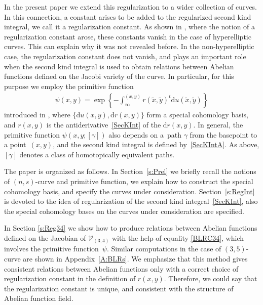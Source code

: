 \documentclass[11pt]{article}
\numberwithin{equation}{section}
\newcommand{\rmd}{\mathrm{d}}
\begin{document}
In the present paper we extend this regularization to a wider collection of curves. In this connection, a constant arises to be added to the regularized second kind integral, we call it a regularization constant. As shown in \cite[Section~193]{BakerAF}, where the notion of a regularization constant arose, these constants vanish in the case of hyperelliptic curves. This can explain why it was not revealed before. In the non-hyperelliptic case, the regularization constant does not vanish, and plays an important role when the second kind integral is used to obtain relations between Abelian functions defined on the Jacobi variety of the curve. In particular, for this purpose we employ the primitive function
\begin{gather}\label{PsiDef0}
 \psi(x,y) = \exp\left\{-\int_{\infty}^{(x,y)} r(\tilde{x},\tilde{y})^{t} \rmd u(\tilde{x},\tilde{y}) \right\}
\end{gather}
introduced in \cite{BL2005}, where $\{\rmd u(x,y),\rmd r(x,y)\}$ form a special cohomology basis, and $r(x,y)$ is the antiderivative~\eqref{SecKInt} of the $\rmd r(x,y)$. In general, the primitive function $\psi(x,y;[\gamma])$ also depends on a~path $\gamma$ from the basepoint to a point~$(x,y)$, and the second kind integral is defined by~\eqref{SecKIntA}. As above, $[\gamma]$ denotes a class of homotopically equivalent paths.

The paper is organized as follows. In Section~\ref{s:Prel} we briefly recall the notions of $(n,s)$-curve and primitive function, we explain how to construct the special cohomology basis, and specify the curves under consideration. Section~\ref{s:RegInt} is devoted to the idea of regularization of the second kind integral~\eqref{SecKInt}, also the special cohomology bases on the curves under consideration are specified.

In Section \ref{s:Reg34} we show how to produce relations between Abelian functions defined on the Jacobian of $\mathcal{V}_{(3,4)}$ with the help of equality \eqref{BLRC34}, which involves the primitive function~$\psi$. Si\-mi\-lar computations in the case of $(3,5)$-curve are shown in Appendix~\ref{A:BLRs}. We emphasize that this method gives consistent relations between Abelian functions only with a correct choice of regularization constant in the definition of $r(x,y)$. Therefore, we could say that the regularization constant is unique, and consistent with the structure of Abelian function field.
\end{document}
